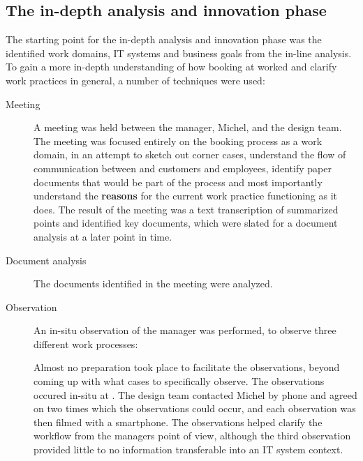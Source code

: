 \subsection{The in-depth analysis and innovation phase}
The starting point for the in-depth analysis and innovation phase was the
identified work domains, IT systems and business goals from the in-line
analysis.  To gain a more in-depth understanding of how booking at \gomonkey{}
worked and clarify work practices in general, a number of techniques were used:

\begin{description}
    \item [Meeting] A meeting was held
        between the manager, Michel, and the design team. The meeting was
        focused entirely on the booking process as a work domain, in an attempt
        to sketch out corner cases, understand the flow of communication between
        \gomonkey{} and customers and employees, identify paper documents that
        would be part of the process and most importantly understand the
        \textbf{reasons} for the current work practice functioning as it does.
        The result of the meeting was a text transcription of summarized points
        and identified key documents, which were slated for a document analysis
        at a later point in time. 

    \item [Document analysis] The documents identified in the meeting were
        analyzed. 

    \item [Observation] An in-situ observation of the manager was performed,
        to observe three different work processes: 
        Almost no preparation took place to facilitate the observations, beyond
        coming up with what cases to specifically observe. The observations
        occured in-situ at \gomonkey{}. The design team contacted Michel by
        phone and agreed on two times which the observations could occur, and
        each observation was then filmed with a smartphone. The observations
        helped clarify the workflow from the managers point of view, although
        the third observation provided little to no information transferable
        into an IT system context.


\end{description}
